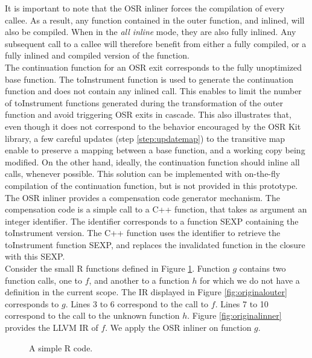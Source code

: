 It is important to note that the OSR inliner forces the compilation of every callee. 
As a result, any function contained in the outer function, and inlined, will also be compiled. 
When in the \textit{all inline} mode, they are also fully inlined.
Any subsequent call to a callee will therefore benefit from either a fully compiled, or a fully inlined and compiled version of the function.\\

The continuation function for an OSR exit corresponds to the fully unoptimized base function. 
The toInstrument function is used to generate the continuation function and does not contain any inlined call.
This enables to limit the number of toInstrument functions generated during the transformation of the outer function and avoid triggering OSR exits in cascade.
This also illustrates that, even though it does not correspond to the behavior encouraged by the OSR Kit library, a few careful updates (step \ref{step:updatemap}) to the transitive map enable to preserve a mapping between a base function, and a working copy being modified.
On the other hand, ideally, the continuation function should inline all calls, whenever possible.
This solution can be implemented with on-the-fly compilation of the continuation function, but is not provided in this prototype.\\

The OSR inliner provides a compensation code generator mechanism. 
The compensation code is a simple call to a C++ function, that takes as argument an integer identifier.
The identifier corresponds to a function SEXP containing the toInstrument version.
The C++ function uses the identifier to retrieve the toInstrument function SEXP, and replaces the invalidated function in the closure with this SEXP.\\

Consider the small R functions defined in Figure \ref{fig:simplercode}.
Function $g$ contains two function calls, one to $f$, and another to a function $h$ for which we do not have a definition in the current scope.
The IR displayed in Figure \ref{fig:originalouter} corresponds to $g$.
Lines 3 to 6 correspond to the call to $f$.
Lines 7 to 10 correspond to the call to the unknown function $h$.
Figure \ref{fig:originalinner} provides the LLVM IR of $f$.
We apply the OSR inliner on function $g$.\\

\begin{figure}[h!]
\centering
{}
\caption{A simple R code.}
\label{fig:simplercode}
\end{figure}


